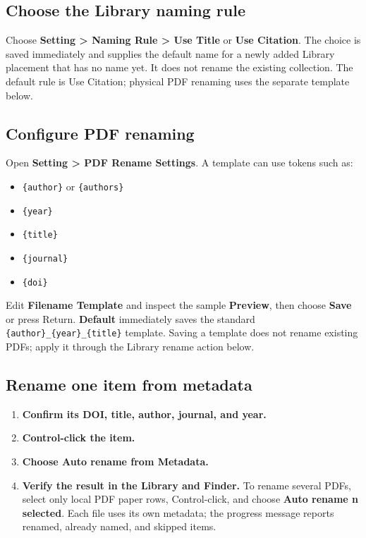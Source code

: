\documentclass[10pt,letterpaper,oneside]{scrreprt}
\providecommand{\tightlist}{\setlength{\itemsep}{1pt}\setlength{\parskip}{0pt}}
\begin{document}
\subsection{Choose the Library naming rule}\label{choose-the-library-naming-rule}

Choose \textbf{Setting \textgreater{} Naming Rule \textgreater{} Use Title} or \textbf{Use Citation}. The choice is saved immediately and supplies the default name for a newly added Library placement that has no name yet. It does not rename the existing collection. The default rule is Use Citation; physical PDF renaming uses the separate template below.

\subsection{Configure PDF renaming}\label{configure-pdf-renaming}

Open \textbf{Setting \textgreater{} PDF Rename Settings}. A template can use tokens such as:

\begin{itemize}
\tightlist
\item
  \texttt{\{author\}} or \texttt{\{authors\}}
\item
  \texttt{\{year\}}
\item
  \texttt{\{title\}}
\item
  \texttt{\{journal\}}
\item
  \texttt{\{doi\}}
\end{itemize}

Edit \textbf{Filename Template} and inspect the sample \textbf{Preview}, then choose \textbf{Save} or press Return. \textbf{Default} immediately saves the standard \texttt{\{author\}\_\{year\}\_\{title\}} template. Saving a template does not rename existing PDFs; apply it through the Library rename action below.

\subsection{Rename one item from metadata}\label{rename-one-item-from-metadata}

\begin{enumerate}
\tightlist
\item
  \textbf{Confirm its DOI, title, author, journal, and year.}
\item
  \textbf{Control-click the item.}
\item
  \textbf{Choose \textbf{Auto rename from Metadata}.}
\item
  \textbf{Verify the result in the Library and Finder.} To rename several PDFs, select only local PDF paper rows, Control-click, and choose \textbf{Auto rename n selected}. Each file uses its own metadata; the progress message reports renamed, already named, and skipped items.
\end{enumerate}
\end{document}
